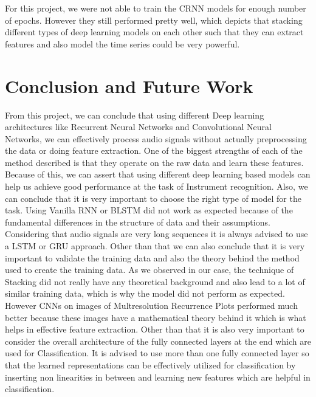 \documentclass[letterpaper, 12 pt, conference]{ieeeconf}  %
\begin{document}
For this project, we were not able to train the CRNN models for enough number of epochs. However they still performed pretty well, which depicts that stacking different types of deep learning models on each other such that they can extract features and also model the time series could be very powerful.



\section{\textbf{Conclusion and Future Work}}
From this project, we can conclude that using different Deep learning architectures like Recurrent Neural Networks and Convolutional Neural Networks, we can effectively process audio signals without actually preprocessing the data or doing feature extraction. One of the biggest strengths of each of the method described is that they operate on the raw data and learn these features. Because of this, we can assert that using different deep learning based models can help us achieve good performance at the task of Instrument recognition. Also, we can conclude that it is very important to choose the right type of model for the task. Using Vanilla RNN or BLSTM did not work as expected because of the fundamental differences in the structure of data and their assumptions. Considering that audio signals are very long sequences it is always advised to use a LSTM or GRU approach. Other than that we can also conclude that it is very important to validate the training data and also the theory behind the method used to create the training data. As we observed in our case, the technique of Stacking did not really have any theoretical background and also lead to a lot of similar training data, which is why the model did not perform as expected. However CNNs on images of Multresolution Recurrence Plots performed much better because these images have a mathematical theory behind it which is what helps in effective feature extraction. Other than that it is also very important to consider the overall architecture of the fully connected layers at the end which are used for Classification. It is advised to use more than one fully connected layer so that the learned representations can be effectively utilized for classification by inserting non linearities in between and learning new features which are helpful in classification.
\end{document}
